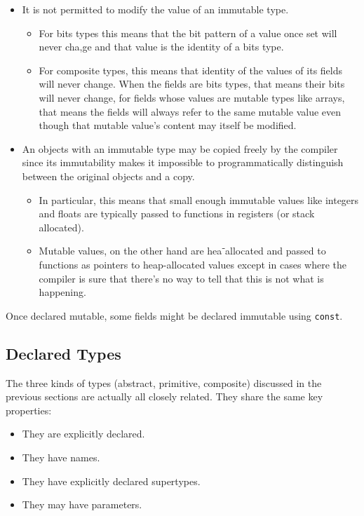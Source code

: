 \documentclass[
]{article}
\providecommand{\tightlist}{%
  \setlength{\itemsep}{0pt}\setlength{\parskip}{0pt}}
\begin{document}
\begin{itemize}
\tightlist
\item
  It is not permitted to modify the value of an immutable type.

  \begin{itemize}
  \tightlist
  \item
    For bits types this means that the bit pattern of a value once set
    will never cha,ge and that value is the identity of a bits type.
  \item
    For composite types, this means that identity of the values of its
    fields will never change. When the fields are bits types, that means
    their bits will never change, for fields whose values are mutable
    types like arrays, that means the fields will always refer to the
    same mutable value even though that mutable value's content may
    itself be modified.
  \end{itemize}
\item
  An objects with an immutable type may be copied freely by the compiler
  since its immutability makes it impossible to programmatically
  distinguish between the original objects and a copy.

  \begin{itemize}
  \tightlist
  \item
    In particular, this means that small enough immutable values like
    integers and floats are typically passed to functions in registers
    (or stack allocated).
  \item
    Mutable values, on the other hand are hea⁻allocated and passed to
    functions as pointers to heap-allocated values except in cases where
    the compiler is sure that there's no way to tell that this is not
    what is happening.
  \end{itemize}
\end{itemize}

Once declared mutable, some fields might be declared immutable using
\texttt{const}.

\hypertarget{declared-types}{%
\subsection{Declared Types}\label{declared-types}}

The three kinds of types (abstract, primitive, composite) discussed in
the previous sections are actually all closely related. They share the
same key properties:

\begin{itemize}
\tightlist
\item
  They are explicitly declared.
\item
  They have names.
\item
  They have explicitly declared supertypes.
\item
  They may have parameters.
\end{itemize}
\end{document}
